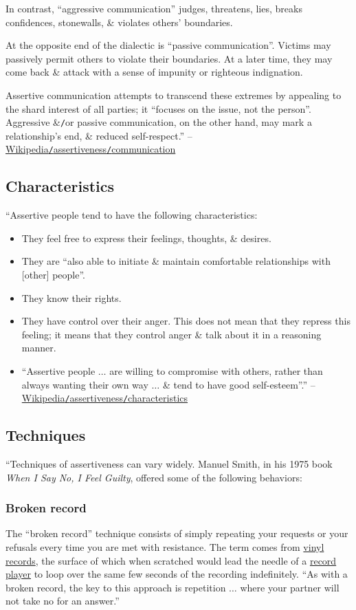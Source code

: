 \documentclass[oneside]{book}
\numberwithin{equation}{section}
\begin{document}
In contrast, ``aggressive communication'' judges, threatens, lies, breaks confidences, stonewalls, \& violates others' boundaries.

At the opposite end of the dialectic is ``passive communication''. Victims may passively permit others to violate their boundaries. At a later time, they may come back \& attack with a sense of impunity or righteous indignation.

Assertive communication attempts to transcend these extremes by appealing to the shard interest of all parties; it ``focuses on the issue, not the person''. Aggressive \&\texttt{/}or passive communication, on the other hand, may mark a relationship's end, \& reduced self-respect.'' -- \href{https://en.wikipedia.org/wiki/Assertiveness#Communication}{Wikipedia\texttt{/}assertiveness\texttt{/}communication}

\subsection{Characteristics}
``Assertive people tend to have the following characteristics:
\begin{itemize}
	\item They feel free to express their feelings, thoughts, \& desires.
	\item They are ``also able to initiate \& maintain comfortable relationships with [other] people''.
	\item They know their rights.
	\item They have control over their anger. This does not mean that they repress this feeling; it means that they control anger \& talk about it in a reasoning manner.
	\item ``Assertive people $\ldots$ are willing to compromise with others, rather than always wanting their own way $\ldots$ \& tend to have good self-esteem''.'' -- \href{https://en.wikipedia.org/wiki/Assertiveness#Characteristics}{Wikipedia\texttt{/}assertiveness\texttt{/}characteristics}
\end{itemize}

\subsection{Techniques}
``Techniques of assertiveness can vary widely. Manuel Smith, in his 1975 book \textit{When I Say No, I Feel Guilty}, offered some of the following behaviors:

\subsubsection{Broken record}
The ``broken record'' technique consists of simply repeating your requests or your refusals every time you are met with resistance. The term comes from \href{https://en.wikipedia.org/wiki/Vinyl_record}{vinyl records}, the surface of which when scratched would lead the needle of a \href{https://en.wikipedia.org/wiki/Record_player}{record player} to loop over the same few seconds of the recording indefinitely. ``As with a broken record, the key to this approach is repetition $\ldots$ where your partner will not take no for an answer.''
\end{document}
